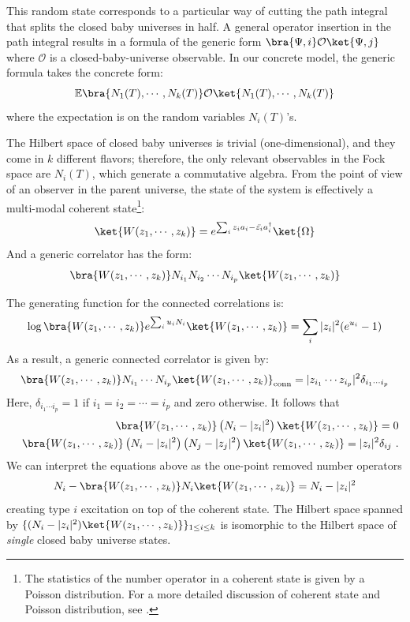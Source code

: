 \documentclass[a4paper,11pt]{article}
\theoremstyle{definition}
\numberwithin{equation}{section}
\newcommand{\lb}{\left(}
\newcommand{\rb}{\right)}
\newcommand{\nn}{\nonumber}
\begin{document}
This random state corresponds to a particular way of cutting the path integral that splits the closed baby universes in half. A general operator insertion in the path integral results in a formula of the generic form $\bra{\Psi, i}\mathcal{O}\ket{\Psi, j}$ where $\mathcal{O}$ is a closed-baby-universe observable. In our concrete model, the generic formula takes the concrete form:
\begin{equation}
\mathbb{E}\bra{N_1(T),\cdots,N_k(T)}\mathcal{O}\ket{N_1(T),\cdots,N_k(T)}
\end{equation}
where the expectation is on the random variables $N_i(T)$'s.

The Hilbert space of closed baby universes is trivial (one-dimensional), and they come in $k$ different flavors; therefore, the only relevant observables in the Fock space are $N_i(T)$, which generate a commutative algebra. 
From the point of view of an observer in the parent universe, the state of the system is effectively a multi-modal coherent state\footnote{The statistics of the number operator in a coherent state is given by a Poisson distribution. For a more detailed discussion of coherent state and Poisson distribution, see  \cite{QuantumOptics}.}:
\begin{equation}
    \ket{W(z_1,\cdots,z_k)} = e^{\sum_iz_ia_i - \bar{z_i}a^\dagger_i}\ket{\Omega}
\end{equation}
And a generic correlator has the form:
\begin{equation}
    \bra{W(z_1,\cdots,z_k)}N_{i_1}N_{i_2}\cdots N_{i_p}\ket{W(z_1,\cdots,z_k)}
\end{equation}

The generating function for the connected correlations is:
\begin{equation}
    \log\bra{W(z_1,\cdots,z_k)}e^{\sum_i u_i N_i}\ket{W(z_1,\cdots,z_k)} = \sum_i |z_i|^2(e^{u_i} - 1)
\end{equation}
As a result, a generic connected correlator is given by:
\begin{equation}
    \bra{W(z_1,\cdots,z_k)}N_{i_1}\cdots N_{i_p}\ket{W(z_1,\cdots,z_k)}_\text{conn} = |z_{i_1}\cdots z_{i_p}|^2\delta_{i_1\cdots i_p}
\end{equation}
Here, $\delta_{i_1\cdots i_p}=1$ if $i_1=i_2=\cdots =i_p$ and zero otherwise.
It follows that 
\begin{eqnarray}
&&\bra{W(z_1,\cdots,z_k)}\lb N_i-|z_i|^2\rb\ket{W(z_1,\cdots,z_k)}=0\nn\\
       && \bra{W(z_1,\cdots,z_k)}\lb N_i-|z_i|^2\rb\lb N_j-|z_j|^2\rb\ket{W(z_1,\cdots,z_k)}=|z_i|^2 \delta_{ij}\ .
\end{eqnarray}
We can interpret the equations above as the one-point removed number operators
\begin{eqnarray}
 N_i-\bra{W(z_1,\cdots,z_k)}N_i\ket{W(z_1,\cdots, z_k)}=N_i-|z_i|^2   
\end{eqnarray}
creating type $i$ excitation on top of the coherent state. The Hilbert space spanned by $\{(N_i-|z_i|^2)\ket{W(z_1,\cdots,z_k)}\}_{1\leq i\leq k}$ is isomorphic to the Hilbert space of \textit{single} closed baby universe states. 
\end{document}
